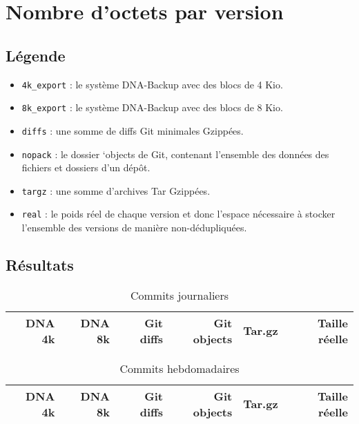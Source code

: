 \documentclass[a4paper]{report}
\newcommand{\fonts}[2][m]{{\fontseries{#1}\selectfont #2}} %
\newcommand{\textb}{\fonts[b]}
\begin{document}
\section{Nombre d'octets par version}

\subsection{Légende}

\begin{itemize}
\item
  \verb|4k_export| : le système DNA-Backup avec des blocs de 4 Kio.
\item
  \verb|8k_export| : le système DNA-Backup avec des blocs de 8 Kio.
\item
  \verb|diffs| : une somme de diffs Git minimales Gzippées.
\item
  \verb|nopack| : le dossier `objects de Git, contenant l'ensemble des
  données des fichiers et dossiers d'un dépôt.
\item
  \verb|targz| : une somme d'archives Tar Gzippées.
\item
  \verb|real| : le poids réel de chaque version et donc l'espace
  nécessaire à stocker l'ensemble des versions de manière
  non-dédupliquées.
\end{itemize}

\subsection{Résultats}


\begin{table*}[ht]
\centering
\begin{tabularx}{\textwidth}{@{}RRRRRR}
\textb{DNA 4k} &
\textb{DNA 8k} &
\textb{Git diffs} &
\textb{Git objects} &
\textb{Tar.gz} &
\textb{Taille réelle} \\
\hline

\end{tabularx}
\caption{Commits journaliers}
\label{tab:commits-daily}
\end{table*}


\begin{table*}[ht]
\centering
\begin{tabularx}{\textwidth}{@{}RRRRRR}
\textb{DNA 4k} &
\textb{DNA 8k} &
\textb{Git diffs} &
\textb{Git objects} &
\textb{Tar.gz} &
\textb{Taille réelle} \\
\hline

\end{tabularx}
\caption{Commits hebdomadaires}
\label{tab:commits-weekly}
\end{table*}
\end{document}
